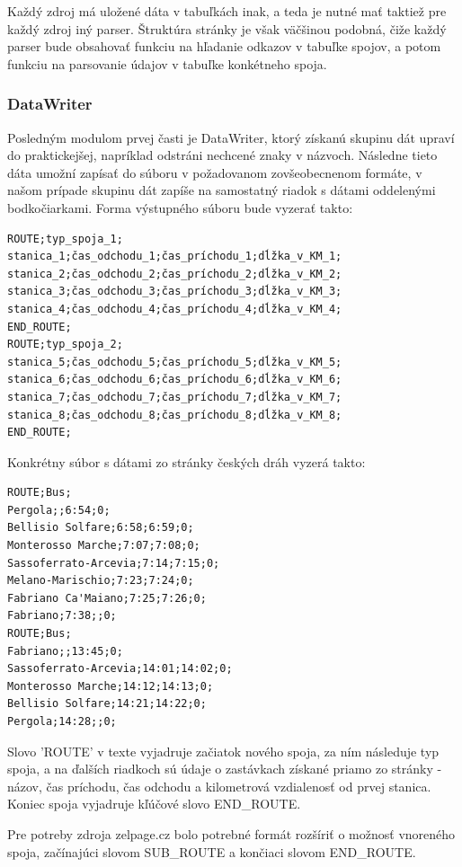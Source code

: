 \documentclass[12pt,twoside,slovak,a4paper]{article}
\begin{document}
Každý zdroj má uložené dáta v tabuľkách inak, a teda je nutné mať taktiež pre každý zdroj iný parser. Štruktúra stránky je však väčšinou podobná, čiže každý parser bude obsahovať funkciu na hľadanie odkazov v tabuľke spojov, a potom funkciu na parsovanie údajov v tabuľke konkétneho spoja.

		\subsubsection{DataWriter}
		Posledným modulom prvej časti je DataWriter, ktorý získanú skupinu dát upraví do praktickejšej, napríklad odstráni nechcené znaky v názvoch. Následne tieto dáta umožní zapísať do súboru v požadovanom zovšeobecnenom formáte, v našom prípade skupinu dát zapíše na samostatný riadok s dátami oddelenými bodkočiarkami. Forma výstupného súboru bude vyzerať takto:
	\small
		\begin{verbatim}
ROUTE;typ_spoja_1;
stanica_1;čas_odchodu_1;čas_príchodu_1;dĺžka_v_KM_1;
stanica_2;čas_odchodu_2;čas_príchodu_2;dĺžka_v_KM_2;
stanica_3;čas_odchodu_3;čas_príchodu_3;dĺžka_v_KM_3;
stanica_4;čas_odchodu_4;čas_príchodu_4;dĺžka_v_KM_4;
END_ROUTE;
ROUTE;typ_spoja_2;
stanica_5;čas_odchodu_5;čas_príchodu_5;dĺžka_v_KM_5;
stanica_6;čas_odchodu_6;čas_príchodu_6;dĺžka_v_KM_6;
stanica_7;čas_odchodu_7;čas_príchodu_7;dĺžka_v_KM_7;
stanica_8;čas_odchodu_8;čas_príchodu_8;dĺžka_v_KM_8;
END_ROUTE;
		\end{verbatim}
	\normalsize	
	
Konkrétny súbor s dátami zo stránky českých dráh vyzerá takto:	
		\small
		\begin{verbatim}
ROUTE;Bus;
Pergola;;6:54;0;
Bellisio Solfare;6:58;6:59;0;
Monterosso Marche;7:07;7:08;0;
Sassoferrato-Arcevia;7:14;7:15;0;
Melano-Marischio;7:23;7:24;0;
Fabriano Ca'Maiano;7:25;7:26;0;
Fabriano;7:38;;0;
ROUTE;Bus;
Fabriano;;13:45;0;
Sassoferrato-Arcevia;14:01;14:02;0;
Monterosso Marche;14:12;14:13;0;
Bellisio Solfare;14:21;14:22;0;
Pergola;14:28;;0;
		\end{verbatim}
	\normalsize	
Slovo 'ROUTE' v texte vyjadruje začiatok nového spoja, za ním následuje typ spoja, a na ďalších riadkoch sú údaje o zastávkach získané priamo zo stránky - názov, čas príchodu, čas odchodu a kilometrová vzdialenosť od prvej stanica. Koniec spoja vyjadruje kľúčové slovo END\_ROUTE.
	
	Pre potreby zdroja zelpage.cz bolo potrebné formát rozšíriť o možnosť vnoreného spoja, začínajúci slovom SUB\_ROUTE a končiaci slovom END\_ROUTE.
	
\end{document}
